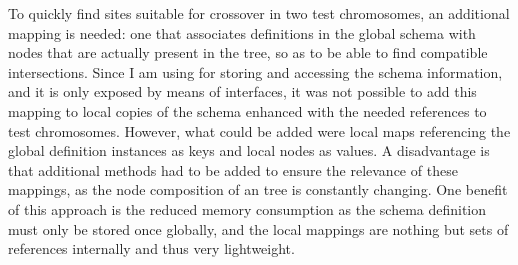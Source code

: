 To quickly find sites suitable for crossover in two test chromosomes, an additional mapping is needed: 
one that associates definitions in the global schema with nodes that are actually present in the \xml tree, so 
as to be able to find compatible intersections.
Since I am using \xerces for storing and accessing the schema information, and it is only exposed by means of 
\java interfaces, it was not possible to add this mapping to local copies of the schema  
enhanced with the needed references to test chromosomes. However, what could be added were local 
maps referencing the global definition instances as keys and local nodes as values. A disadvantage 
is that additional methods had to be added to ensure the relevance of these mappings, 
as the node composition of an \xml tree is constantly changing. 
One benefit of this approach is the reduced memory consumption as the schema
definition must only be stored once globally, and the local mappings are nothing but sets of references 
internally and thus very lightweight.

